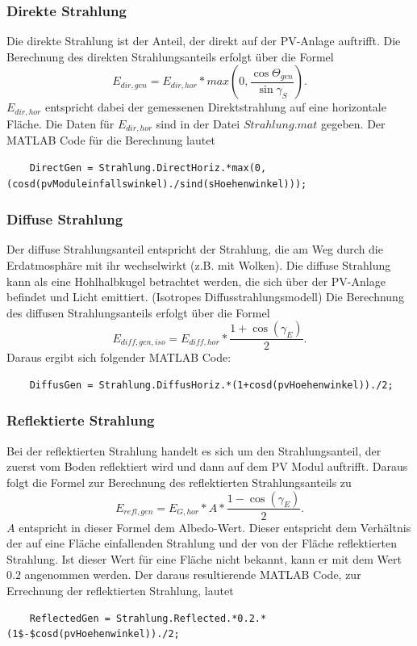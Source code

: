 \documentclass[a4paper,12pt]{article}
\begin{document}
	\subsubsection{Direkte Strahlung}
	Die direkte Strahlung ist der Anteil, der direkt auf der PV-Anlage auftrifft.\newline
	Die Berechnung des direkten Strahlungsanteils erfolgt über die Formel
	\begin{equation}
		E_{dir,gen}=E_{dir,hor}*{max(0,\frac{\cos{\Theta_{gen}}}{\sin{\gamma_S}})}.
	\end{equation}
	$E_{dir,hor}$ entspricht dabei der gemessenen Direktstrahlung auf eine horizontale Fläche. Die Daten für $E_{dir,hor}$ sind in der Datei $Strahlung.mat$ gegeben.
	Der MATLAB Code für die Berechnung lautet
	\begin{lstlisting}
	DirectGen = Strahlung.DirectHoriz.*max(0, (cosd(pvModuleinfallswinkel)./sind(sHoehenwinkel)));
	\end{lstlisting}
	\subsubsection{Diffuse Strahlung}
	Der diffuse Strahlungsanteil entspricht der Strahlung, die am Weg durch die Erdatmosphäre mit ihr wechselwirkt (z.B. mit Wolken).
	Die diffuse Strahlung kann als eine Hohlhalbkugel betrachtet werden, die sich über der PV-Anlage befindet und Licht emittiert. (Isotropes Diffusstrahlungsmodell)\newline
	Die Berechnung des diffusen Strahlungsanteils erfolgt über die Formel
	\begin{equation}
		E_{diff,gen,iso}=E_{diff,hor}*\frac{1+\cos{(\gamma_E)}}{2}.
	\end{equation}
	Daraus ergibt sich folgender MATLAB Code:
	\begin{lstlisting}
	DiffusGen = Strahlung.DiffusHoriz.*(1+cosd(pvHoehenwinkel))./2;
	\end{lstlisting}
	\subsubsection{Reflektierte Strahlung}
	Bei der reflektierten Strahlung handelt es sich um den Strahlungsanteil, der zuerst vom Boden reflektiert wird und dann auf dem PV Modul auftrifft.\newline
	Daraus folgt die Formel zur Berechnung des reflektierten Strahlungsanteils zu
	\begin{equation}
		E_{refl,gen}=E_{G,hor}*A*\frac{1-\cos{(\gamma_E)}}{2}.
	\end{equation}
	$A$ entspricht in dieser Formel dem Albedo-Wert. Dieser entspricht dem Verhältnis der auf eine Fläche einfallenden Strahlung und der von der Fläche reflektierten Strahlung. Ist dieser Wert für eine Fläche nicht bekannt, kann er mit dem Wert $0.2$ angenommen werden.\newline
	Der daraus resultierende MATLAB Code, zur Errechnung der reflektierten Strahlung, lautet
	\begin{lstlisting}
	ReflectedGen = Strahlung.Reflected.*0.2.*(1$-$cosd(pvHoehenwinkel))./2;
	\end{lstlisting}
\end{document}
